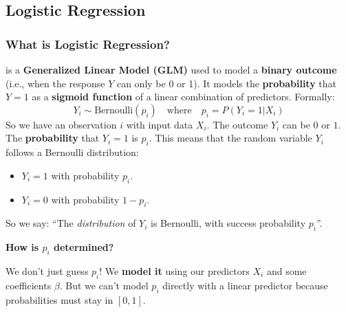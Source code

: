 \subsection{Logistic Regression}

\subsubsection{What is Logistic Regression?}

 is a \textbf{Generalized Linear Model (GLM)} used to model a \textbf{binary outcome} (i.e., when the response $Y$ can only be 0 or 1). It models the \textbf{probability} that $Y = 1$ as a \textbf{sigmoid function} of a linear combination of predictors. Formally:
\begin{equation}
    Y_i \sim \text{Bernoulli}\left(p_i\right) \quad \text{where} \quad p_i = P\left(Y_i = 1 | X_i\right)
\end{equation}
So we have an observation $i$ with input data $X_i$. The outcome $Y_i$ can be $0$ or $1$. The \textbf{probability} that $Y_i = 1$ is $p_i$. This means that the random variable $Y_i$ follows a Bernoulli distribution:
\begin{itemize}
    \item $Y_i = 1$ with probability $p_i$.
    \item $Y_i = 0$ with probability $1 - p_i$.
\end{itemize}
So we say: ``The \emph{distribution} of $Y_i$ is Bernoulli, with success probability $p_i$''.

\highspace
\begin{flushleft}
    \textcolor{Green3}{ \textbf{How is $p_i$ determined?}}
\end{flushleft}
We don't just guess $p_i$! We \textbf{model it} using our predictors $X_i$ and some coefficients $\beta$. But we can't model $p_i$ directly with a linear predictor because probabilities must stay in $[0,1]$.

